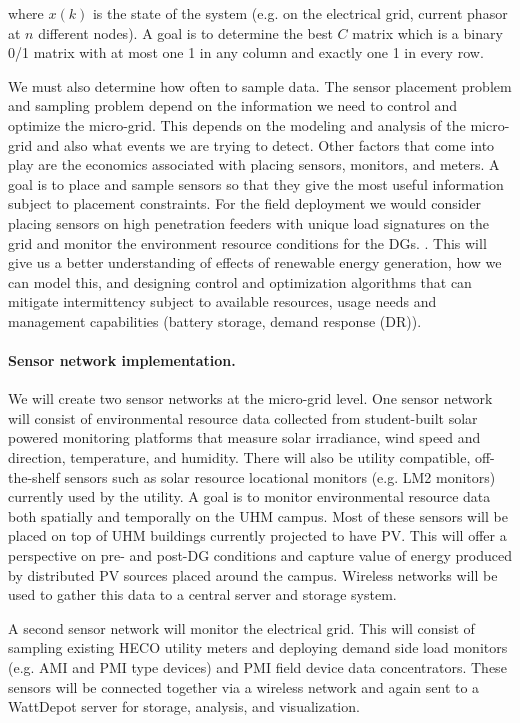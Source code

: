 \noindent where $x(k)$ is the state of the system (e.g. on the electrical grid,
current phasor at $n$ different nodes).  A goal is to determine the best
$C$ matrix which is a binary 0/1 matrix with at most one 1 in any column
and exactly one 1 in every row.

We must also determine how often to sample data. The sensor placement problem and sampling problem depend on the information we need to control and optimize the micro-grid. This depends on the modeling and analysis of the micro-grid and also what events we are trying to detect. Other factors that come into play are the economics associated with placing sensors, monitors, and meters. A goal is to place and sample sensors so that they give the most useful information subject to placement constraints. For the field deployment we would consider placing sensors on high penetration feeders with unique load signatures on the grid and  monitor the environment resource conditions for the DGs.  . This will give us a better understanding of effects of renewable energy generation, how we can model this, and designing control and optimization algorithms that can mitigate intermittency subject to available resources, usage needs and management capabilities (battery storage, demand response (DR)).

\paragraph{Sensor network implementation.}

We will create two sensor networks at the micro-grid level. One sensor network will consist of environmental resource data collected from student-built solar powered monitoring platforms that measure solar irradiance, wind speed and direction, temperature, and humidity. There will also be utility compatible, off-the-shelf sensors such as solar resource locational monitors (e.g. LM2 monitors) currently used by the utility. A goal is to monitor environmental resource data both spatially and temporally on the UHM campus. Most of these sensors will be placed on top of UHM buildings currently projected to have PV. This will offer a perspective on pre- and post-DG conditions and capture value of energy produced by distributed PV sources placed around the campus. Wireless networks will be used to gather this data to a central server and
storage system.

A second sensor network will monitor the electrical grid.  This will
consist of sampling existing HECO utility meters and deploying demand side
load monitors (e.g.  AMI and PMI type devices) and PMI field device data
concentrators.  These sensors will be connected together via a wireless
network and again sent to a WattDepot server for storage, analysis, and visualization.

